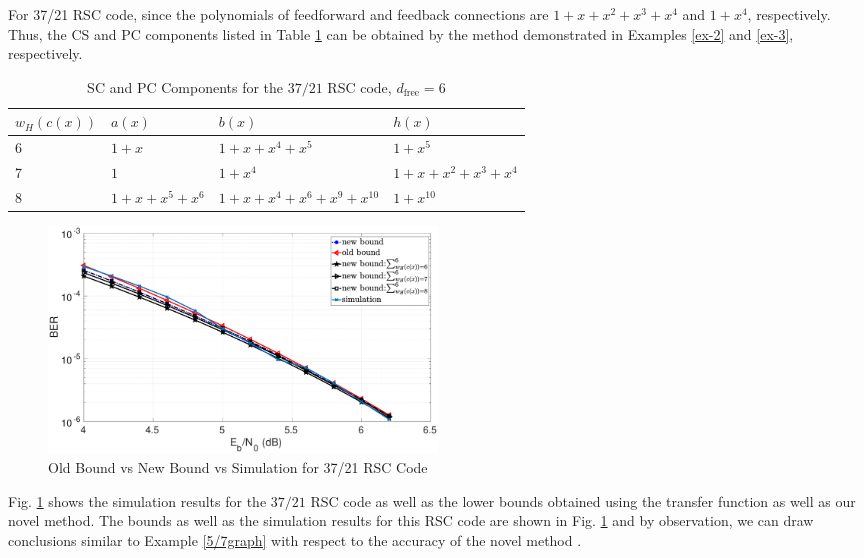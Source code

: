 \begin{example}
For 37/21 RSC code, since the polynomials of feedforward and feedback connections are $1+x+x^2+x^3+x^4$ and $1+x^4$, respectively. Thus, the CS and PC components listed in Table \ref{novelTab14} can be obtained by the method demonstrated in Examples \ref{ex-2} and \ref{ex-3}, respectively.
\begin{table}[htbp]
	\caption{SC and PC Components for the $37/21$ RSC code, $d_{\text{free}}=6$}
	\centering
	\begin{tabularx}{0.75\textwidth}{Xlll} 
		\hline
		$w_H(c(x))$&$a(x)$ & $b(x)$ & $h(x)$ \\ [0.5ex] 
		\hline\hline
		6&$1+x$ & $1+x+x^{4}+x^5$ & $1+x^5$\\
		\hline\hline
		7&$1$ & $1+x^4$ & $1+x+x^2+x^3+x^4$\\
		\hline\hline
		8&$1+x+x^5+x^6$ & $1+x+x^4+x^6+x^9+x^{10}$ & $1+x^{10}$\\
		\hline
	\end{tabularx}
	
	\label{novelTab14}
\end{table}

\begin{figure}[htbp]
	\centering
	\includegraphics[width=0.5\textwidth]{./Images/RSC_37_21_lower_weights2.eps}
	\caption{Old Bound vs New Bound vs Simulation for 37/21 RSC Code}
	\label{simFig2}
\end{figure}
Fig. \ref{simFig2} shows the simulation results for the $37/21$ RSC code as well as the lower bounds obtained using the transfer function as well as our novel method. The bounds as well as the simulation results for this RSC code are shown in Fig. \ref{simFig2} and by observation, we can draw conclusions similar to  Example \ref{5/7graph} with respect to the accuracy of the novel method .


\end{example}
